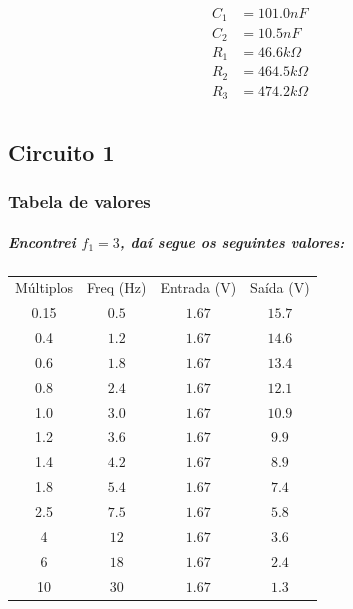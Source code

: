 \documentclass[12pt,twoside, a4paper, twocolumn]{article}
\begin{document}
\begin{equation*}
    \begin{aligned}
        C_1 & = 101.0nF           \\
        C_2 & = 10.5nF            \\
        R_1 & = 46.6 k \varOmega  \\
        R_2 & = 464.5 k \varOmega \\
        R_3 & = 474.2 k \varOmega \\
    \end{aligned}
\end{equation*}




\subsection{Circuito 1}


\subsubsection{Tabela de valores}


\subparagraph*{Encontrei $f_1 = 3$, daí segue os seguintes valores:}


\begin{center}
    \begin{tabular}{ |c|c|c|c| }
        \hline
        Múltiplos & Freq (Hz) & Entrada (V) & Saída (V) \\
        0.15      & $0.5$     & $1.67$      & $15.7$    \\
        0.4       & $1.2$     & $1.67$      & $14.6$    \\
        0.6       & $1.8$     & $1.67$      & $13.4$    \\
        0.8       & $2.4$     & $1.67$      & $12.1$    \\
        1.0       & $3.0$     & $1.67$      & $10.9$    \\
        1.2       & $3.6$     & $1.67$      & $9.9$     \\
        1.4       & $4.2$     & $1.67$      & $8.9$     \\
        1.8       & $5.4$     & $1.67$      & $7.4$     \\
        2.5       & $7.5$     & $1.67$      & $5.8$     \\
        4         & $12$      & $1.67$      & $3.6$     \\
        6         & $18$      & $1.67$      & $2.4$     \\
        10        & $30$      & $1.67$      & $1.3$     \\
        \hline
    \end{tabular}
\end{center}
\end{document}
